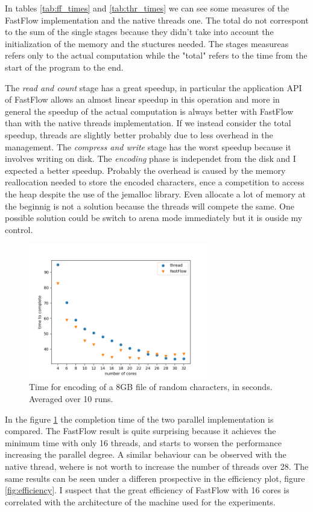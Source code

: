 \documentclass[12pt, letterpaper]{article}
\begin{document}
In tables \ref{tab:ff_times} and \ref{tab:thr_times} we can see some measures of the FastFlow implementation and the native threads one. The total do not correspont to the sum of the single stages because they didn't take into account the initialization of the memory and the stuctures needed. The stages measureas refers only to the actual computation while the "total" refers to the time from the start of the program to the end.

The \textit{read and count} stage has a great speedup, in particular the application API of FastFlow allows an almost linear speedup in this operation and more in general the speedup of the actual computation is always better with FastFlow than with the native threads implementation. If we instead consider the total speedup, threads are slightly better probably due to less overhead in the management. The \textit{compress and write} stage has the worst speedup because it involves writing on disk. The \textit{encoding} phase is independet from the disk and I expected a better speedup. Probably the overhead is caused by the memory reallocation needed to store the encoded characters, ence a competition to access the heap despite the use of the jemalloc library. Even allocate a lot of memory at the beginnig is not a solution because the threads will compete the same. One possible solution could be switch to arena mode immediately but it is ouside my control.

\begin{figure}
    \centering
    \includegraphics[width=0.7\textwidth]{./images/time_to_complete.png}
    \caption{Time for encoding of a 8GB file of random characters, in seconds. Averaged over 10 runs.}
    \label{fig:time_to_complete}
\end{figure}

In the figure \ref{fig:time_to_complete} the completion time of the two parallel implementation is compared. The FastFlow result is quite surprising because it achieves the minimum time with only 16 threads, and starts to worsen the performance increasing the parallel degree. A similar behaviour can be observed with the native thread, wehere is not worth to increase the number of threads over 28. The same results can be seen under a differen prospective in the efficiency plot, figure \ref{fig:efficiency}. I suspect that the great efficiency of FastFlow with 16 cores is correlated with the architecture of the machine used for the experiments.
\end{document}
